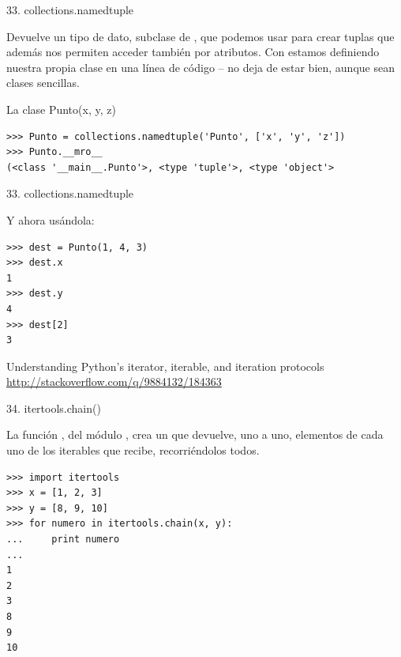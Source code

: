 \documentclass[14pt]{beamer}
\begin{document}
\begin{frame}[fragile]{33. collections.namedtuple}
  \small
  \begin{block}{}
    \centering
    Devuelve un tipo de dato, subclase de , que
    podemos usar para crear tuplas que además nos permiten acceder
    también por atributos.  Con  estamos
    definiendo nuestra propia clase en una línea de código -- no deja
    de estar bien, aunque sean clases sencillas.
  \end{block}

  \scriptsize
  \begin{exampleblock}
    {\footnotesize La clase Punto(x, y, z)}
    \begin{lstlisting}
>>> Punto = collections.namedtuple('Punto', ['x', 'y', 'z'])
>>> Punto.__mro__
(<class '__main__.Punto'>, <type 'tuple'>, <type 'object'>
    \end{lstlisting}
  \end{exampleblock}
\end{frame}

\begin{frame}[fragile]{33. collections.namedtuple}
  \small
  \begin{exampleblock}
    {Y ahora usándola:}
    \begin{lstlisting}
>>> dest = Punto(1, 4, 3)
>>> dest.x
1
>>> dest.y
4
>>> dest[2]
3
    \end{lstlisting}
  \end{exampleblock}

  \begin{block}
    {\centering Understanding Python's iterator, iterable, and iteration protocols}
    \centering \url{http://stackoverflow.com/q/9884132/184363}
  \end{block}
\end{frame}

\begin{frame}[fragile]{34. itertools.chain()}
  \small
  \begin{block}{}
    \centering
    La función , del módulo ,
    crea un  que devuelve, uno a uno, elementos de
    cada uno de los iterables que recibe, recorriéndolos todos.
  \end{block}

  \footnotesize
  \begin{exampleblock}{}
    \begin{lstlisting}
>>> import itertools
>>> x = [1, 2, 3]
>>> y = [8, 9, 10]
>>> for numero in itertools.chain(x, y):
...     print numero
...
1
2
3
8
9
10
    \end{lstlisting}
  \end{exampleblock}
\end{frame}
\end{document}
